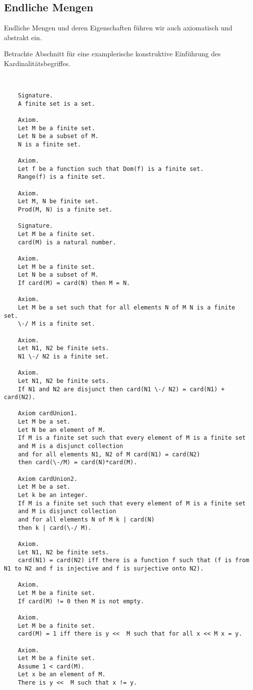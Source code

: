 \documentclass[a4paper,12pt]{scrartcl}
\begin{document}
\subsection{Endliche Mengen}

Endliche Mengen und deren Eigenschaften führen wir auch axiomatisch und abstrakt ein.

Betrachte Abschnitt für eine examplerische konstruktive Einführung des Kardinalitätsbegriffes.

\begin{lstlisting}


	Signature.
	A finite set is a set.
	
	Axiom.
	Let M be a finite set.
	Let N be a subset of M.
	N is a finite set.
	
	Axiom.
	Let f be a function such that Dom(f) is a finite set.
	Range(f) is a finite set.
	
	Axiom.
	Let M, N be finite set.
	Prod(M, N) is a finite set.
	
	Signature.
	Let M be a finite set.
	card(M) is a natural number.
	
	Axiom.
	Let M be a finite set.
	Let N be a subset of M.
	If card(M) = card(N) then M = N.
	
	Axiom.
	Let M be a set such that for all elements N of M N is a finite set.
	\-/ M is a finite set.
	
	Axiom.
	Let N1, N2 be finite sets.
	N1 \-/ N2 is a finite set.
	
	Axiom.
	Let N1, N2 be finite sets.
	If N1 and N2 are disjunct then card(N1 \-/ N2) = card(N1) + card(N2).
	
	Axiom cardUnion1.
	Let M be a set.
	Let N be an element of M.
	If M is a finite set such that every element of M is a finite set
	and M is a disjunct collection 
	and for all elements N1, N2 of M card(N1) = card(N2)
	then card(\-/M) = card(N)*card(M).
	
	Axiom cardUnion2.
	Let M be a set.
	Let k be an integer.
	If M is a finite set such that every element of M is a finite set
	and M is disjunct collection
	and for all elements N of M k | card(N)
	then k | card(\-/ M).
	
	Axiom.
	Let N1, N2 be finite sets.
	card(N1) = card(N2) iff there is a function f such that (f is from N1 to N2 and f is injective and f is surjective onto N2).
	
	Axiom.
	Let M be a finite set.
	If card(M) != 0 then M is not empty.
	
	Axiom.
	Let M be a finite set.
	card(M) = 1 iff there is y <<  M such that for all x << M x = y.
	
	Axiom.
	Let M be a finite set.
	Assume 1 < card(M).
	Let x be an element of M.
	There is y <<  M such that x != y.

\end{lstlisting}
\end{document}

